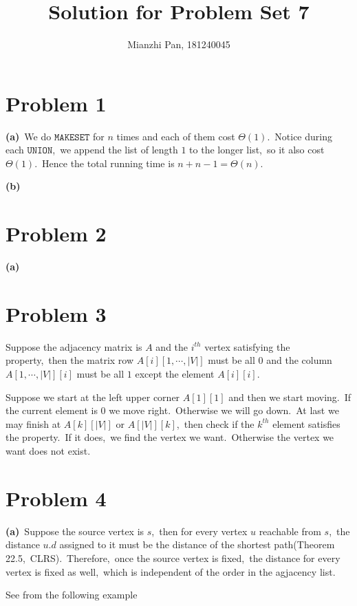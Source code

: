 \documentclass[]{article}
\title{Solution for Problem Set 7}
\author{Mianzhi Pan, 181240045}
\begin{document}
	\maketitle
	\section{Problem 1}
	\textbf{(a)}\ We do $\mathtt{MAKESET}$ for $n$ times and each of them cost $\Theta(1)$.\ Notice during each $\mathtt{UNION}$,\ we append the list of length $1$ to the longer list,\ so it also cost $\Theta(1)$.\ Hence the total running time is $n + n - 1 = \Theta(n)$.
	
	\textbf{(b)}\  
	
	\section{Problem 2}
	\textbf{(a)}
	
	\section{Problem 3}
	Suppose the adjacency matrix is $A$ and the $i^{th}$ vertex satisfying the property,\ then the matrix row $A[i][1,\cdots,|V|]$ must be all $0$ and the column $A[1,\cdots,|V|][i]$ must be all $1$ except the element $A[i][i]$.
	
	Suppose we start at the left upper corner $A[1][1]$ and then we start moving.\ If the current element is $0$ we move right.\ Otherwise we will go down.\ At last we may finish at $A[k][|V|]$ or $A[|V|][k]$,\ then check if the $k^{th}$ element satisfies the property.\ If it does,\ we find the vertex we want.\ Otherwise the vertex we want does not exist.
	
	\section{Problem 4}
	\textbf{(a)}\ Suppose the source vertex is $s$,\ then for every vertex $u$ reachable from $s$,\ the distance $u.d$ assigned to it must be the distance of the shortest path(Theorem 22.5,\ CLRS).\ Therefore,\ once the source vertex is fixed,\ the distance for every vertex is fixed as well,\ which is independent of the order in the agjacency list.
	
	See from the following example
	
\end{document}
